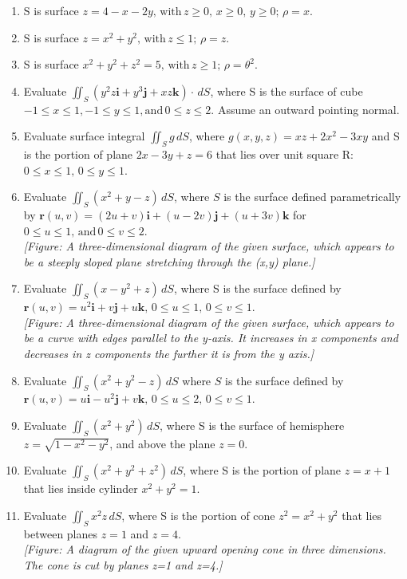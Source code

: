 \documentclass{exercises}
\begin{document}
\begin{enumerate}[resume]
\item \techrequired S is surface $z=4-x-2y,\,\text{with}\,z\ge0,\,x\ge0,\,y\ge0;\,\rho=x$.
\item \techrequired S is surface $z=x^{2}+y^{2},\,\text{with}\,z\le1;\,\rho=z$.
\item \techrequired S is surface $x^{2}+y^{2}+z^{2}=5,\,\text{with}\,z\ge1;\,\rho=\theta^{2}$.
\item Evaluate $\iint_{S}(y^{2}z\mathbf{i}+y^{3}\mathbf{j}+xz\mathbf{k})\cdot \,dS$, where S is the surface of cube $-1\le x\le1,-1\le y\le1,\text{and}\,0\le z\le2$. Assume an outward pointing normal.
\item Evaluate surface integral $\iint_{S}g\,dS$, where $g(x,y,z)=xz+2x^{2}-3xy$ and S is the portion of plane $2x-3y+z=6$ that lies over unit square R: $0\le x\le1,\,0\le y\le1$.
\item Evaluate $\iint_{S}(x^{2}+y-z)\,dS$, where $S$ is the surface defined parametrically by $\mathbf{r}(u,v)=(2u+v)\mathbf{i}+(u-2v)\mathbf{j}+(u+3v)\mathbf{k}$ for $0\le u\le1,\,\text{and}\,0\le v\le2$. \\ \textit{[Figure: A three-dimensional diagram of the given surface, which appears to be a steeply sloped plane stretching through the (x,y) plane.]}
\item \techrequired Evaluate $\iint_{S}(x-y^{2}+z)\,dS$, where S is the surface defined by $\mathbf{r}(u,v)=u^{2}\mathbf{i}+v\mathbf{j}+u\mathbf{k},\,0\le u\le1,\,0\le v\le1$. \\ \textit{[Figure: A three-dimensional diagram of the given surface, which appears to be a curve with edges parallel to the y-axis. It increases in x components and decreases in z components the further it is from the y axis.]}
\item \techrequired Evaluate $\iint_{S}(x^{2}+y^{2}-z)\,dS$ where $S$ is the surface defined by $\mathbf{r}(u,v)=u\mathbf{i}-u^{2}\mathbf{j}+v\mathbf{k},\,0\le u\le2,\,0\le v\le1$.
\item Evaluate $\iint_{S}(x^{2}+y^{2})\,dS$, where S is the surface of hemisphere $z=\sqrt{1-x^{2}-y^{2}}$, and above the plane $z=0$.
\item Evaluate $\iint_{S}(x^{2}+y^{2}+z^{2})\,dS$, where S is the portion of plane $z=x+1$ that lies inside cylinder $x^{2}+y^{2}=1$.
\item \techrequired Evaluate $\iint_{S}x^{2}z\,dS$, where S is the portion of cone $z^{2}=x^{2}+y^{2}$ that lies between planes $z=1$ and $z=4$. \\ \textit{[Figure: A diagram of the given upward opening cone in three dimensions. The cone is cut by planes z=1 and z=4.]}

\end{enumerate}
\end{document}
